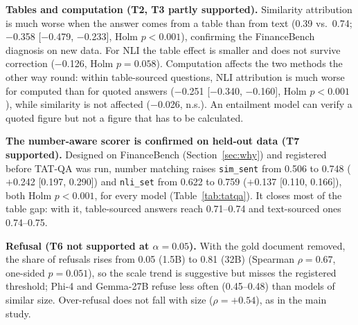\documentclass[conference]{IEEEtran}
\newcommand{\m}[1]{\texttt{#1}}   %
\begin{document}
\textbf{Tables and computation (T2, T3 partly supported).} Similarity attribution is much worse when the answer comes from a table than from text
(0.39 vs.\ 0.74; $-$0.358 [$-$0.479, $-$0.233], Holm $p<0.001$), confirming the FinanceBench diagnosis on new data. For NLI the table effect is
smaller and does not survive correction ($-$0.126, Holm $p=0.058$). Computation affects the two methods the other way round: within table-sourced
questions, NLI attribution is much worse for computed than for quoted answers ($-$0.251 [$-$0.340, $-$0.160], Holm $p<0.001$), while similarity is
not affected ($-$0.026, n.s.). An entailment model can verify a quoted figure but not a figure that has to be calculated.

\textbf{The number-aware scorer is confirmed on held-out data (T7 supported).} Designed on FinanceBench (Section~\ref{sec:why}) and registered before
TAT-QA was run, number matching raises \m{sim\_sent} from 0.506 to 0.748 ($+$0.242 [0.197, 0.290]) and \m{nli\_set} from 0.622 to 0.759 ($+$0.137
[0.110, 0.166]), both Holm $p<0.001$, for every model (Table~\ref{tab:tatqa}). It closes most of the table gap: with it, table-sourced answers reach
0.71--0.74 and text-sourced ones 0.74--0.75.

\textbf{Refusal (T6 not supported at $\alpha=0.05$).} With the gold document removed, the share of refusals rises from 0.05 (1.5B) to 0.81 (32B)
(Spearman $\rho=0.67$, one-sided $p=0.051$), so the scale trend is suggestive but misses the registered threshold; Phi-4 and Gemma-27B refuse less
often (0.45--0.48) than models of similar size. Over-refusal does not fall with size ($\rho=+0.54$), as in the main study.
\end{document}
